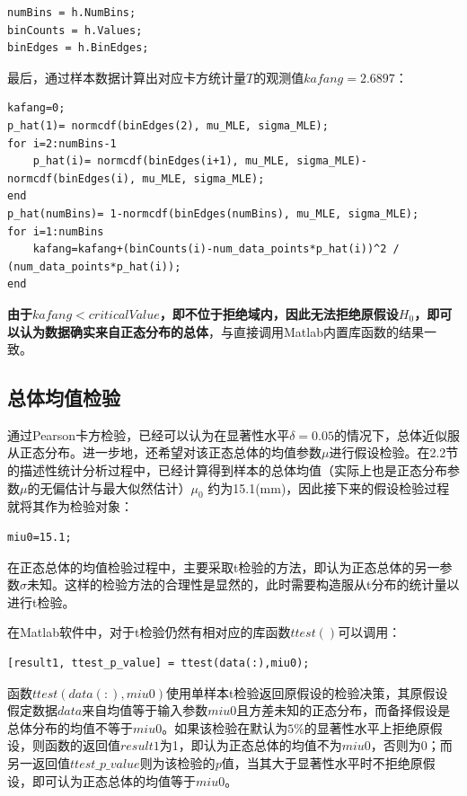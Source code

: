 \documentclass[12pt]{article}  %
\begin{document}
\begin{lstlisting}
numBins = h.NumBins;
binCounts = h.Values;
binEdges = h.BinEdges;
\end{lstlisting}

最后，通过样本数据计算出对应卡方统计量$T$的观测值$kafang = 2.6897$：
\begin{lstlisting}
kafang=0;
p_hat(1)= normcdf(binEdges(2), mu_MLE, sigma_MLE);
for i=2:numBins-1
	p_hat(i)= normcdf(binEdges(i+1), mu_MLE, sigma_MLE)-normcdf(binEdges(i), mu_MLE, sigma_MLE);
end
p_hat(numBins)= 1-normcdf(binEdges(numBins), mu_MLE, sigma_MLE);
for i=1:numBins
	kafang=kafang+(binCounts(i)-num_data_points*p_hat(i))^2 / (num_data_points*p_hat(i));
end
\end{lstlisting}

\textbf{由于$ kafang<criticalValue $，即不位于拒绝域内，因此无法拒绝原假设$H_0$，即可以认为数据确实来自正态分布的总体}，与直接调用Matlab内置库函数的结果一致。

\subsection{总体均值检验}
通过Pearson卡方检验，已经可以认为在显著性水平$\delta=0.05$的情况下，总体近似服从正态分布。进一步地，还希望对该正态总体的均值参数$\mu$进行假设检验。在2.2节的描述性统计分析过程中，已经计算得到样本的总体均值（实际上也是正态分布参数$\mu$的无偏估计与最大似然估计）$\mu_0$ 约为15.1(mm)，因此接下来的假设检验过程就将其作为检验对象：

\begin{lstlisting}
miu0=15.1;
\end{lstlisting}

在正态总体的均值检验过程中，主要采取t检验的方法，即认为正态总体的另一参数$\sigma$未知。这样的检验方法的合理性是显然的，此时需要构造服从t分布的统计量以进行t检验。

在Matlab软件中，对于t检验仍然有相对应的库函数$ttest()$可以调用：

\begin{lstlisting}
[result1, ttest_p_value] = ttest(data(:),miu0);
\end{lstlisting}

函数$ttest(data(:),miu0)$使用单样本t检验返回原假设的检验决策，其原假设假定数据$data$来自均值等于输入参数$miu0$且方差未知的正态分布，而备择假设是总体分布的均值不等于$miu0$。如果该检验在默认为$5\%$的显著性水平上拒绝原假设，则函数的返回值$result1$为1，即认为正态总体的均值不为$miu0$，否则为0；而另一返回值$ttest\_p\_value$则为该检验的$p$值，当其大于显著性水平时不拒绝原假设，即可认为正态总体的均值等于$miu0$。
\end{document}
